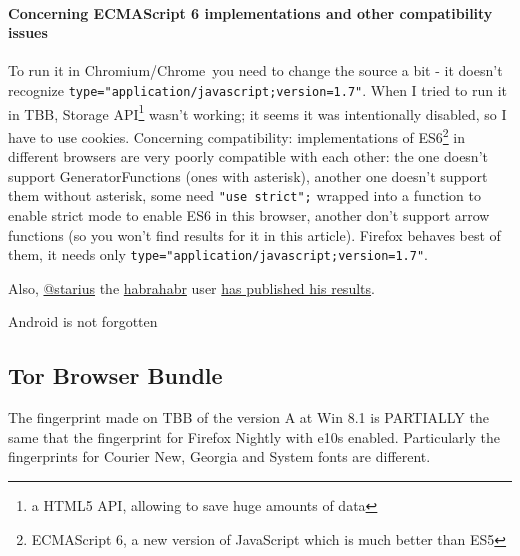 \documentclass[letterpaper,14pt]{article}
\begin{document}


\paragraph{Concerning ECMAScript 6 implementations and other compatibility issues}\label{concerning-ecmascript-6-implementations}

To run it in Chromium\texttrademark/Chrome\texttrademark\ you need to change the source a bit - it doesn't recognize \lstinline!type="application/javascript;version=1.7"!. When I tried to run it in TBB, Storage API\footnote{a HTML5 API, allowing to save huge amounts of data} wasn't working; it seems it was intentionally disabled, so I have to use cookies. Concerning compatibility: implementations of ES6\footnote{ECMAScript 6, a new version of JavaScript which is much better than ES5} in different browsers are very poorly compatible with each other: the one doesn't support GeneratorFunctions (ones with asterisk), another one doesn't support them without asterisk, some need \lstinline!"use strict";! wrapped into a function to enable strict mode to enable ES6 in this browser, another don't support arrow functions (so you won't find results for it in this article). Firefox behaves best of them, it needs only \lstinline!type="application/javascript;version=1.7"!.




Also, \href{https://geektimes.ru/users/starius/}{@starius} the \href{http://habrahabr.ru/}{habrahabr} user \href{https://geektimes.ru/post/244484/\#comment_8227810}{has published his results}.



Android is not forgotten



\subsection{Tor Browser Bundle}\label{tor-browser-bundle}

The fingerprint made on TBB of the version A at Win 8.1 is PARTIALLY the same that the fingerprint for Firefox Nightly with e10s enabled. Particularly the fingerprints for Courier New, Georgia and System fonts are different.
\end{document}
